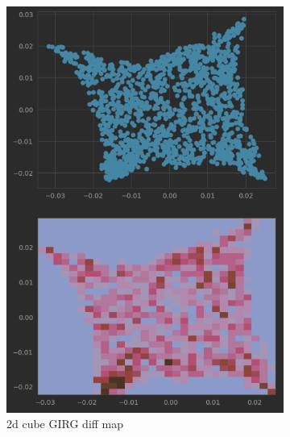 \begin{figure}
    \centering

    \begin{subfigure}{0.45\textwidth}
      \centering
      \includegraphics[width=\linewidth]{figures/diffmap_plot_nonuniformed.png}
      \caption{2d cube GIRG diff map}
      \label{fig:sub1}
    \end{subfigure}
    \hfill
    \begin{subfigure}{0.45\textwidth}
      \centering

\end{subfigure}
\end{figure}
